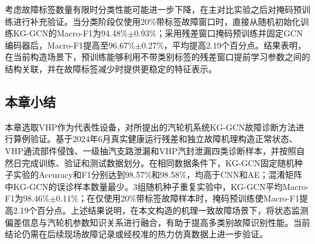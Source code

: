 考虑故障标签数量有限时分类性能可能进一步下降，在主对比实验之后对掩码预训练进行补充验证。当分类阶段仅使用20\%带标签故障窗口时，直接从随机初始化训练KG-GCN的Macro-F1为94.48\%$\pm$0.93\%；采用残差窗口掩码预训练并固定GCN编码器后，Macro-F1提高至96.67\%$\pm$0.27\%，平均提高2.19个百分点。结果表明，在当前构造场景下，预训练能够利用不带类别标签的残差窗口提前学习参数之间的结构关联，并在故障标签减少时提供更稳定的特征表示。

\subsection{本章小结}

本章选取VHP作为代表性设备，对所提出的汽轮机系统KG-GCN故障诊断方法进行算例验证。基于2024年6月真实健康运行残差和独立故障机理构造正常状态、VHP通流部件侵蚀、一级抽汽支路泄漏和VHP汽封泄漏四类诊断样本，并按照自然日完成训练、验证和测试数据划分。在相同数据条件下，KG-GCN固定随机种子实验的Accuracy和F1分别达到98.57\%和98.58\%，均高于CNN和AE；混淆矩阵中KG-GCN的误诊样本数量最少。3组随机种子重复实验中，KG-GCN平均Macro-F1为98.46\%$\pm$0.11\%；在仅使用20\%带标签故障样本时，掩码预训练使Macro-F1提高2.19个百分点。上述结果说明，在本文构造的机理一致故障场景下，将状态监测偏差信息与汽轮机参数知识关系进行融合，有助于提高多类别故障识别性能。当前结论仍需在后续现场故障记录或经校准的热力仿真数据上进一步验证。